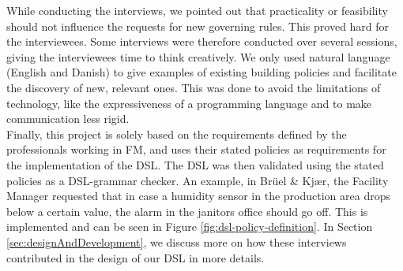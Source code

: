 While conducting the interviews, we pointed out that practicality or feasibility should not influence the requests for new governing rules. This proved hard for the interviewees. Some interviews were therefore conducted over several sessions, giving the interviewees time to think creatively. We only used natural language (English and Danish) to give examples of existing building policies and facilitate the discovery of new, relevant ones. This was done to avoid the limitations of technology, like the expressiveness of a programming language and to make communication less rigid.\\ 

Finally, this project is solely based on the requirements defined by the professionals working in FM, and uses their stated policies as requirements for the implementation of the DSL. The DSL was then validated using the stated policies as a DSL-grammar checker. An example, in Br\"{u}el \& Kj\ae r, the Facility Manager requested that in case a humidity sensor in the production area drops below a certain value, the alarm in the janitors office should go off. This is implemented and can be seen in Figure \ref{fig:dsl-policy-definition}. In Section \ref{sec:designAndDevelopment}, we discuss more on how these interviews contributed in the design of our DSL in more details.